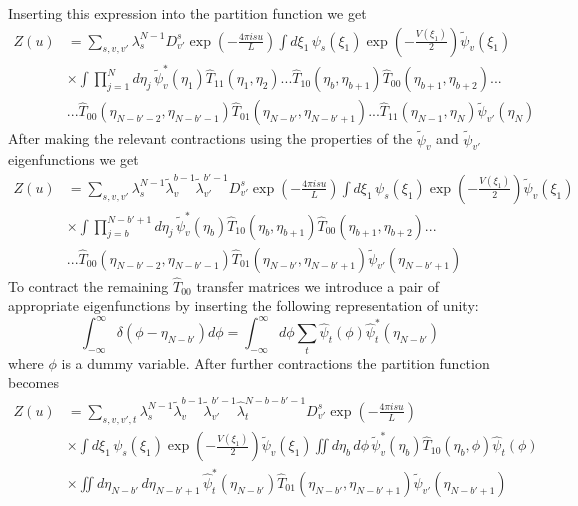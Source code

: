 %
Inserting this expression into the partition function we get
%
\begin{align}
\label{dna_dfray_2}
Z\left(u\right)&=\sum_{s,v,v'}\lambda_{s}^{N-1}D^{s}_{v'}\exp\left(-\frac{4\pi isu}{L}\right)\int d\xi_{1}\,\psi_{s}\left(\xi_{1}\right)\exp\left(-\frac{V\left(\xi_{1}\right)}{2}\right)\tilde{\psi}_{v}\left(\xi_{1}\right)\nonumber\\
&\times\int\prod_{j=1}^{N}d\eta_{j}\,\tilde{\psi}^{*}_{v}\left(\eta_{1}\right)\hat{T}_{11}\left(\eta_{1},\eta_{2}\right)...\hat{T}_{10}\left(\eta_{b},\eta_{b+1}\right)\hat{T}_{00}\left(\eta_{b+1},\eta_{b+2}\right)...\nonumber\\
&...\hat{T}_{00}\left(\eta_{N-b'-2},\eta_{N-b'-1}\right)\hat{T}_{01}\left(\eta_{N-b'},\eta_{N-b'+1}\right)...\hat{T}_{11}\left(\eta_{N-1},\eta_{N}\right)\tilde{\psi}_{v'}\left(\eta_{N}\right)
\end{align}
%
After making the relevant contractions using the properties of the $\tilde{\psi}_{v}$ and $\tilde{\psi}_{v'}$ eigenfunctions we get
%
\begin{align}
\label{dna_dfray_3}
Z\left(u\right)&=\sum_{s,v,v'}\lambda_{s}^{N-1}\tilde{\lambda}_{v}^{b-1}\tilde{\lambda}_{v'}^{b'-1}D^{s}_{v'}\exp\left(-\frac{4\pi isu}{L}\right)\int d\xi_{1}\,\psi_{s}\left(\xi_{1}\right)\exp\left(-\frac{V\left(\xi_{1}\right)}{2}\right)\tilde{\psi}_{v}\left(\xi_{1}\right)\nonumber\\
&\times\int\prod_{j=b}^{N-b'+1}d\eta_{j}\,\tilde{\psi}^{*}_{v}\left(\eta_{b}\right)\hat{T}_{10}\left(\eta_{b},\eta_{b+1}\right)\hat{T}_{00}\left(\eta_{b+1},\eta_{b+2}\right)...\nonumber\\
&...\hat{T}_{00}\left(\eta_{N-b'-2},\eta_{N-b'-1}\right)\hat{T}_{01}\left(\eta_{N-b'},\eta_{N-b'+1}\right)\tilde{\psi}_{v'}\left(\eta_{N-b'+1}\right)
\end{align}
%
To contract the remaining $\hat{T}_{00}$ transfer matrices we introduce a pair of appropriate eigenfunctions by inserting the following representation of unity:
%
\begin{equation}
\int_{-\infty}^{\infty}\delta\left(\phi-\eta_{N-b'}\right)d\phi=\int_{-\infty}^{\infty}d\phi\sum_{t}\hat{\psi}_{t}\left(\phi\right)\hat{\psi}_{t}^{*}\left(\eta_{N-b'}\right)
\end{equation}
%
where $\phi$ is a dummy variable. After further contractions the partition function becomes
%
\begin{align}
\label{dna_dfray_4}
Z\left(u\right)&=\sum_{s,v,v',t}\lambda_{s}^{N-1}\tilde{\lambda}_{v}^{b-1}\tilde{\lambda}_{v'}^{b'-1}\hat{\lambda}_{t}^{N-b-b'-1}D^{s}_{v'}\exp\left(-\frac{4\pi isu}{L}\right)\nonumber\\
&\times\int d\xi_{1}\,\psi_{s}\left(\xi_{1}\right)\exp\left(-\frac{V\left(\xi_{1}\right)}{2}\right)\tilde{\psi}_{v}\left(\xi_{1}\right)\iint d\eta_{b}\,d\phi\,\tilde{\psi}^{*}_{v}\left(\eta_{b}\right)\hat{T}_{10}\left(\eta_{b},\phi\right)\hat{\psi}_{t}\left(\phi\right)\nonumber\\
&\times\iint d\eta_{N-b'}\,d\eta_{N-b'+1}\,\hat{\psi}_{t}^{*}\left(\eta_{N-b'}\right)\hat{T}_{01}\left(\eta_{N-b'},\eta_{N-b'+1}\right)\tilde{\psi}_{v'}\left(\eta_{N-b'+1}\right)
\end{align}
